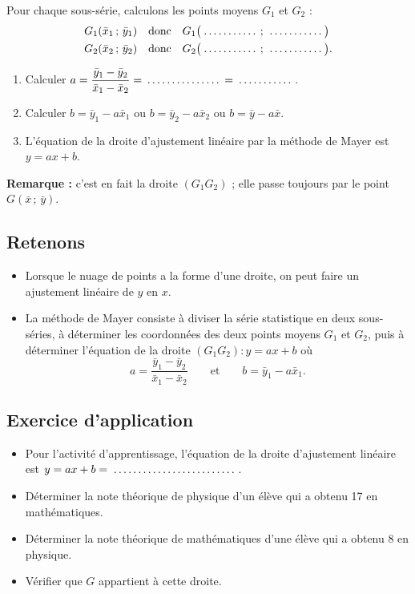 \documentclass[11pt,a4paper]{article}
\newcommand{\blanc}[1][1.8cm]{\makebox[#1]{\dotfill}}
\begin{document}
Pour chaque sous-série, calculons les points moyens $G_1$ et $G_2$ :
\begin{align*}
  G_1(\bar{x}_1\,;\,\bar{y}_1) &\quad\text{donc}\quad G_1\bigl(\blanc\,;\,\blanc\bigr)\\
  G_2(\bar{x}_2\,;\,\bar{y}_2) &\quad\text{donc}\quad G_2\bigl(\blanc\,;\,\blanc\bigr).
\end{align*}
\begin{enumerate}[label=\roman*)]
  \item Calculer
        $a = \dfrac{\bar{y}_1 - \bar{y}_2}{\bar{x}_1 - \bar{x}_2} = \blanc[2.4cm] = \blanc$.
  \item Calculer $b = \bar{y}_1 - a\bar{x}_1$ ou $b = \bar{y}_2 - a\bar{x}_2$ ou
        $b = \bar{y} - a\bar{x}$.
  \item L'équation de la droite d'ajustement linéaire par la méthode de Mayer
        est $y = ax + b$.
\end{enumerate}

\textbf{Remarque :} c'est en fait la droite $(G_1G_2)$ ; elle passe toujours par
le point $G(\bar{x}\,;\,\bar{y})$.

\subsection{Retenons}

\begin{itemize}
    \item Lorsque le nuage de points a la \og forme\fg{} d'une droite, on peut
          faire un ajustement linéaire de $y$ en $x$.
    \item La méthode de Mayer consiste à diviser la série statistique en deux
          sous-séries, à déterminer les coordonnées des deux points moyens
          $G_1$ et $G_2$, puis à déterminer l'équation de la droite
          $(G_1G_2) : y = ax + b$ où
          \[
            a = \frac{\bar{y}_1 - \bar{y}_2}{\bar{x}_1 - \bar{x}_2}
            \qquad\text{et}\qquad
            b = \bar{y}_1 - a\bar{x}_1 .
          \]
\end{itemize}

\subsection{Exercice d'application}

  \begin{itemize}
    \item Pour l'activité d'apprentissage, l'équation de la droite
          d'ajustement linéaire est ${y = ax + b} = \blanc[4cm]$.
    \item Déterminer la note théorique de physique d'un élève qui a obtenu 17
          en mathématiques.
    \item Déterminer la note théorique de mathématiques d'une élève qui a
          obtenu 8 en physique.
    \item Vérifier que $G$ appartient à cette droite.
  \end{itemize}
\end{document}
